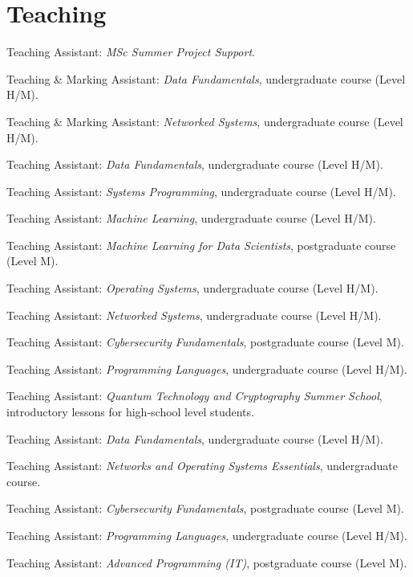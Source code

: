 \section{Teaching}
\begin{cvitemize}[2020--2021]
	\item Teaching Assistant: \emph{MSc Summer Project Support}.
	\item Teaching \&{} Marking Assistant: \emph{Data Fundamentals}, undergraduate course (Level H/M).
	\item Teaching \&{} Marking Assistant: \emph{Networked Systems}, undergraduate course (Level H/M).
\end{cvitemize}
\begin{cvitemize}[2019--2020]
	\item Teaching Assistant: \emph{Data Fundamentals}, undergraduate course (Level H/M).
	\item Teaching Assistant: \emph{Systems Programming}, undergraduate course (Level H/M).
	\item Teaching Assistant: \emph{Machine Learning}, undergraduate course (Level H/M).
	\item Teaching Assistant: \emph{Machine Learning for Data Scientists}, postgraduate course (Level M).
	\item Teaching Assistant: \emph{Operating Systems}, undergraduate course (Level H/M).
	\item Teaching Assistant: \emph{Networked Systems}, undergraduate course (Level H/M).
	\item Teaching Assistant: \emph{Cybersecurity Fundamentals}, postgraduate course (Level M).
	\item Teaching Assistant: \emph{Programming Languages}, undergraduate course (Level H/M).
\end{cvitemize}
\begin{cvitemize}[2018--2019]
	\item Teaching Assistant: \emph{Quantum Technology and Cryptography Summer School}, introductory lessons for high-school level students.
	\item Teaching Assistant: \emph{Data Fundamentals}, undergraduate course (Level H/M).
	\item Teaching Assistant: \emph{Networks and Operating Systems Essentials}, undergraduate course.
	\item Teaching Assistant: \emph{Cybersecurity Fundamentals}, postgraduate course (Level M).
	\item Teaching Assistant: \emph{Programming Languages}, undergraduate course (Level H/M).
\end{cvitemize}
\begin{cvitemize}[2017--2018]
	\item Teaching Assistant: \emph{Advanced Programming (IT)}, postgraduate course (Level M).
\end{cvitemize}

